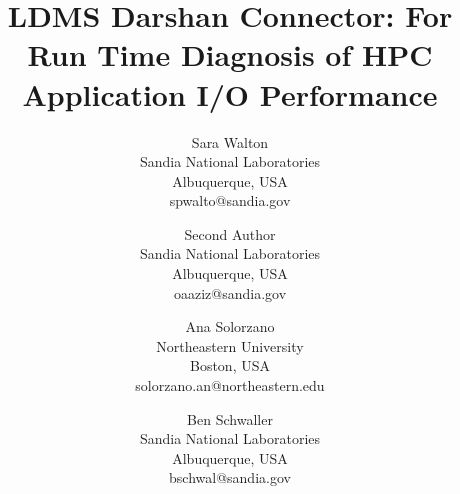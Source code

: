 \documentclass[conference]{IEEEtran}
\begin{document}
\title{LDMS Darshan Connector: For Run Time Diagnosis of HPC Application I/O Performance}
\author{
    Sara Walton\\
    Sandia National Laboratories\\
    Albuquerque, USA \\
    spwalto@sandia.gov
  \and
    Second Author\\
    Sandia National Laboratories\\
    Albuquerque, USA\\
    oaaziz@sandia.gov
    \and
    Ana Solorzano\\
    Northeastern University\\
    Boston, USA\\
    solorzano.an@northeastern.edu
    \and
    Ben Schwaller \\
    Sandia National Laboratories\\
    Albuquerque, USA\\
    bschwal@sandia.gov
}


\begin{comment}
\and
\IEEEauthorblockN{2\textsuperscript{nd} Given Name Surname}
\IEEEauthorblockA{\textit{dept. name of organization (of Aff.)} \\
\textit{name of organization (of Aff.)}\\
City, Country \\
email address or ORCID}
\and
\IEEEauthorblockN{3\textsuperscript{rd} Given Name Surname}
\IEEEauthorblockA{\textit{dept. name of organization (of Aff.)} \\
\textit{name of organization (of Aff.)}\\
City, Country \\
email address or ORCID}
\and
\IEEEauthorblockN{4\textsuperscript{th} Given Name Surname}
\IEEEauthorblockA{\textit{dept. name of organization (of Aff.)} \\
\textit{name of organization (of Aff.)}\\
City, Country \\
email address or ORCID}
\and
\IEEEauthorblockN{5\textsuperscript{th} Given Name Surname}
\IEEEauthorblockA{\textit{dept. name of organization (of Aff.)} \\
\textit{name of organization (of Aff.)}\\
City, Country \\
email address or ORCID}
\and
\IEEEauthorblockN{6\textsuperscript{th} Given Name Surname}
\IEEEauthorblockA{\textit{dept. name of organization (of Aff.)} \\
\textit{name of organization (of Aff.)}\\
City, Country \\
email address or ORCID}
\end{comment}

\maketitle














\end{document}
